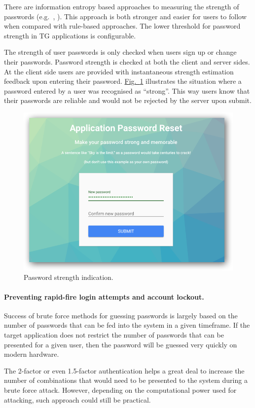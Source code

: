 \documentclass[a4paper,12pt,oneside,openright]{memoir}
\begin{document}
	There are information entropy based approaches to measuring the strength of passwords (e.g.~\cite{NIST}, \cite{DROPBOX}).
	This approach is both stronger and easier for users to follow when compared with rule-based approaches.
	The lower threshold for password strength in TG applications is configurable.

	The strength of user passwords is only checked when users sign up or change their passwords.
	Password strength is checked at both the client and server sides.
	At the client side users are provided with instantaneous strength estimation feedback upon entering their password.
	\hyperref[sec:02:fig:1]{Fig.~\ref*{sec:02:fig:1}} illustrates the situation where a password entered by a user was recognised as ``strong''.
	This way users know that their passwords are reliable and would not be rejected by the server upon submit.

	\begin{figure}[h!tbp]
	\centering
	\includegraphics[width=0.6\linewidth]{images/03-new-user-setting-up-password.png}
	\caption{Password strength indication.}\label{sec:02:fig:1}
	\end{figure}

\paragraph*{Preventing rapid-fire login attempts and account lockout.}

	Success of brute force methods for guessing passwords is largely based on the number of passwords that can be fed into the system in a given timeframe.
	If the target application does not restrict the number of passwords that can be presented for a given user, then the password will be guessed very quickly on modern hardware.

	The 2-factor or even 1.5-factor authentication helps a great deal to increase the number of combinations that would need to be presented to the system during a brute force attack.
	However, depending on the computational power used for attacking, such approach could still be practical.
\end{document}
